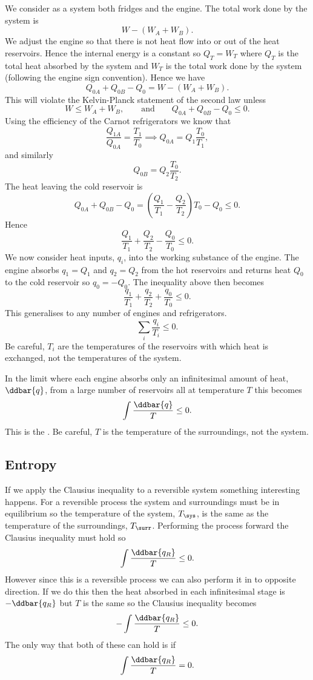     We consider as a system both fridges and the engine.
    The total work done by the system is
    \[W - (W_A + W_B).\]
    We adjust the engine so that there is not heat flow into or out of the heat reservoirs.
    Hence the internal energy is a constant so \(Q_T = W_T\) where \(Q_T\) is the total heat absorbed by the system and \(W_T\) is the total work done by the system (following the engine sign convention).
    Hence we have
    \[Q_{0A} + Q_{0B} - Q_0 = W - (W_A + W_B).\]
    This will violate the Kelvin-Planck statement of the second law unless
    \[W \le W_A + W_B,\qquad\text{and}\qquad Q_{0A} + Q_{0B} - Q_0 \le 0.\]
    Using the efficiency of the Carnot refrigerators we know that
    \[\frac{Q_{1A}}{Q_{0A}} = \frac{T_1}{T_0} \implies Q_{0A} = Q_1\frac{T_0}{T_1},\]
    and similarly
    \[Q_{0B} = Q_2\frac{T_0}{T_2}.\]
    The heat leaving the cold reservoir is
    \[Q_{0A} + Q_{0B} - Q_0 = \left(\frac{Q_1}{T_1} - \frac{Q_2}{T_2}\right)T_0 - Q_0 \le 0.\]
    Hence
    \[\frac{Q_1}{T_1} + \frac{Q_2}{T_2} - \frac{Q_0}{T_0} \le 0.\]
    We now consider heat inputs, \(q_i\), into the working substance of the engine.
    The engine absorbs \(q_1 = Q_1\) and \(q_2 = Q_2\) from the hot reservoirs and returns heat \(Q_0\) to the cold reservoir so \(q_0 = -Q_0\).
    The inequality above then becomes
    \[\frac{q_1}{T_1} + \frac{q_2}{T_2} + \frac{q_0}{T_0} \le 0.\]
    This generalises to any number of engines and refrigerators.
    \[\sum_i \frac{q_i}{T_i} \le 0.\]
    Be careful, \(T_i\) are the temperatures of the reservoirs with which heat is exchanged, not the temperatures of the system.
    
    In the limit where each engine absorbs only an infinitesimal amount of heat, \(\ddbar{q}\), from a large number of reservoirs all at temperature \(T\) this becomes
    \[\int \frac{\ddbar{q}}{T} \le 0.\]
    This is the .
    Be careful, \(T\) is the temperature of the surroundings, not the system.
    
    \subsection{Entropy}
    If we apply the Clausius inequality to a reversible system something interesting happens.
    For a reversible process the system and surroundings must be in equilibrium so the temperature of the system, \(T_\sys\), is the same as the temperature of the surroundings, \(T_\surr\).
    Performing the process forward the Clausius inequality must hold so
    \[\int\frac{\ddbar{q_R}}{T} \le 0.\]
    However since this is a reversible process we can also perform it in to opposite direction.
    If we do this then the heat absorbed in each infinitesimal stage is \(-\ddbar{q_R}\) but \(T\) is the same so the Clausius inequality becomes
    \[-\int\frac{\ddbar{q_R}}{T} \le 0.\]
    The only way that both of these can hold is if
    \[\int\frac{\ddbar{q_R}}{T} = 0.\]
    
